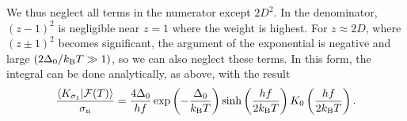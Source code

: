 We thus neglect all terms in the numerator except $2 D^2$.
In the denominator, $(z - 1)^2$ is negligible near $z = 1$ where the weight is highest.
For $z \approx 2 D$, where $(z \pm 1)^2$ becomes significant, the argument of the exponential is negative and large
$(2 \Delta_0 / k_\mathrm{B} T \gg 1)$, so we can also neglect these terms.
In this form, the integral can be done analytically, as above, with the result
\begin{equation}
\frac{\braket{K_{\sigma_1}}{\mathcal{F}(T)}}{\sigma_{\mathrm{n}}}
  =
  \frac{4 \Delta_0}{h f}
  \exp \left( -\frac{\Delta_0}{k_\mathrm{B} T} \right)
  \sinh \left( \frac{h f}{2 k_\mathrm{B} T} \right)
  K_0 \left( \frac{h f}{2 k_\mathrm{B} T} \right).
\label{eqn:first-order_response.responseqpoccupancy_reconductivity_thermal}
\end{equation}


